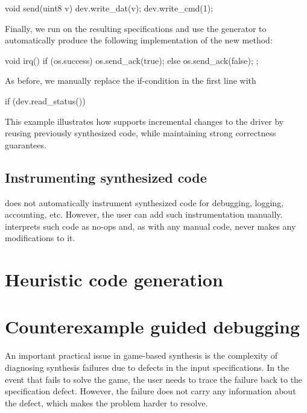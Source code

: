 \begin{tsllisting}
void send(uint8 v){
    dev.write_dat(v);
    dev.write_cmd(1);}
\end{tsllisting}

Finally, we run \termite on the resulting specifications and use the generator to automatically produce the following implementation of the new  method:

\begin{tsllisting}
void irq(){
    if (os.success) {
        os.send_ack(true);
    } else {
        os.send_ack(false);
    };}
\end{tsllisting}

As before, we manually replace the if-condition in the first line with

\begin{tsllisting}
if (dev.read_status())
\end{tsllisting}

This example illustrates how \termite supports incremental changes to the driver by reusing previously synthesized code, while maintaining strong correctness guarantees.

\subsection{Instrumenting synthesized code~~} 
\termite does not automatically instrument synthesized code for debugging, logging, accounting, etc.  However, the user can add such instrumentation manually.  \termite interprets such code as no-ops and, as with any manual code, never makes any modifications to it.

\section{Heuristic code generation}
\label{sec:heuristic_codegen}

\section{Counterexample guided debugging}
\label{s:debug}

An important practical issue in game-based synthesis is the complexity of diagnosing synthesis failures due to defects in the input specifications.  In the event that \termite fails to solve the game, the user needs to trace the failure back to the specification defect.  However, the failure does not carry any information about the defect, which makes the problem harder to resolve.

